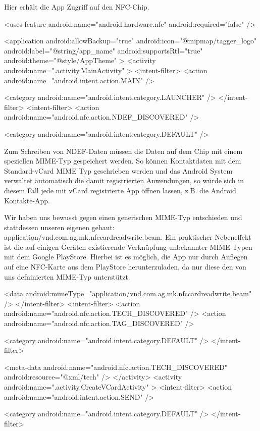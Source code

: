 \documentclass[a4paper,ngerman,12pt]{scrreprt}
\begin{document}
Hier erhält die App Zugriff auf den NFC-Chip. \begin{DoxyVerb}    <uses-feature
        android:name="android.hardware.nfc"
        android:required="false" />

    <application
        android:allowBackup="true"
        android:icon="@mipmap/tagger_logo"
        android:label="@string/app_name"
        android:supportsRtl="true"
        android:theme="@style/AppTheme" >
        <activity android:name=".activity.MainActivity" >
            <intent-filter>
                <action android:name="android.intent.action.MAIN" />

                <category android:name="android.intent.category.LAUNCHER" />
            </intent-filter>
            <intent-filter>
                <action android:name="android.nfc.action.NDEF_DISCOVERED" />

                <category android:name="android.intent.category.DEFAULT" />
\end{DoxyVerb}


Zum Schreiben von NDEF-Daten müssen die Daten auf dem Chip mit einem speziellen MIME-Typ gespeichert werden. So können Kontaktdaten mit dem Standard-vCard MIME Typ geschrieben werden und das Android System verwaltet automatisch die damit registrierten Anwendungen, so würde sich in diesem Fall jede mit vCard registrierte App öffnen lassen, z.B. die Android Kontakte-App.

Wir haben uns bewusst gegen einen generischen MIME-Typ entschieden und stattdessen unseren eigenen gebaut:  application/vnd.com.ag.mk.nfccardreadwrite.beam. Ein praktischer Nebeneffekt ist die auf einigen Geräten existierende Verknüpfung unbekannter MIME-Typen mit dem Google PlayStore. Hierbei ist es möglich, die App nur durch Auflegen auf eine NFC-Karte aus dem PlayStore herunterzuladen, da nur diese den von uns defninierten MIME-Typ unterstützt. \begin{DoxyVerb}                <data android:mimeType="application/vnd.com.ag.mk.nfccardreadwrite.beam" />
            </intent-filter>
            <intent-filter>
                <action android:name="android.nfc.action.TECH_DISCOVERED" />
                <action android:name="android.nfc.action.TAG_DISCOVERED" />

                <category android:name="android.intent.category.DEFAULT" />
            </intent-filter>

            <meta-data
                android:name="android.nfc.action.TECH_DISCOVERED"
                android:resource="@xml/tech" />
        </activity>
        <activity android:name=".activity.CreateVCardActivity" >
            <intent-filter>
                <action android:name="android.intent.action.SEND" />

                <category android:name="android.intent.category.DEFAULT" />
            </intent-filter>
\end{DoxyVerb}
\end{document}
